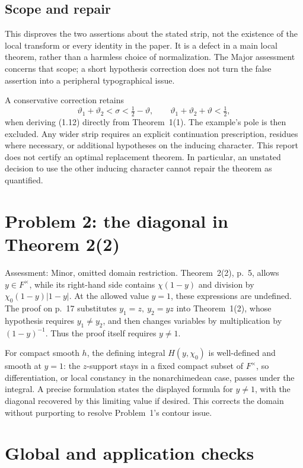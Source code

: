 \documentclass[10pt]{article}
\begin{document}
\subsection*{Scope and repair}
This disproves the two assertions about the stated strip, not the existence of the local transform or every identity in the paper. It is a defect in a main local theorem, rather than a harmless choice of normalization. The Major assessment concerns that scope; a short hypothesis correction does not turn the false assertion into a peripheral typographical issue.\par
A conservative correction retains \[\vartheta_1+\vartheta_2<\sigma<\tfrac12-\vartheta,
 \qquad \vartheta_1+\vartheta_2+\vartheta<\tfrac12,\] when deriving (1.12) directly from Theorem 1(1). The example’s pole is then excluded. Any wider strip requires an explicit continuation prescription, residues where necessary, or additional hypotheses on the inducing character. This report does not certify an optimal replacement theorem. In particular, an unstated decision to use the other inducing character cannot repair the theorem as quantified.\par
\section*{Problem 2: the diagonal in Theorem 2(2)}
Assessment: Minor, omitted domain restriction. Theorem 2(2), p. 5, allows \(y\in F^\times\), while its right-hand side contains \(\chi(1-y)\) and division by \(\chi_0(1-y)|1-y|\). At the allowed value \(y=1\), these expressions are undefined. The proof on p. 17 substitutes \(y_1=z,\ y_2=yz\) into Theorem 1(2), whose hypothesis requires \(y_1\ne y_2\), and then changes variables by multiplication by \((1-y)^{-1}\). Thus the proof itself requires \(y\ne1\).\par
For compact smooth \(h\), the defining integral \(H(y,\chi_0)\) is well-defined and smooth at \(y=1\): the \(z\)-support stays in a fixed compact subset of \(F^\times\), so differentiation, or local constancy in the nonarchimedean case, passes under the integral. A precise formulation states the displayed formula for \(y\ne1\), with the diagonal recovered by this limiting value if desired. This corrects the domain without purporting to resolve Problem 1’s contour issue.\par
\section*{Global and application checks}
\end{document}
